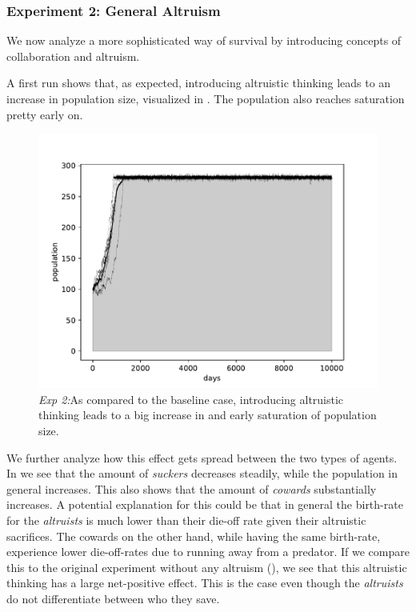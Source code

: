 \documentclass[sigconf]{acmart}
\newcommand{\todo}[1]{{\color{red}{#1}}}
\newcommand{\cowards}{\textit{cowards}\xspace}
\newcommand{\altruists}{\textit{altruists}\xspace}
\newcommand{\suckers}{\textit{suckers}\xspace}
\begin{document}
    \subsubsection*{Experiment 2: General Altruism}

    We now analyze a more sophisticated way of survival by introducing concepts of collaboration and altruism.

    A first run shows that, as expected, introducing altruistic thinking leads to an increase in population size, visualized in .
    The population also reaches saturation pretty early on.

    \begin{figure}
        \includegraphics[width=\columnwidth]{figures/alt_cow_increase_total}
        \caption{\textit{Exp 2:}As compared to the baseline case, introducing altruistic thinking leads to a big increase in and early saturation of population size.
        }
        \label{fig:alt_cow_total}
    \end{figure}

    We further analyze how this effect gets spread between the two types of agents.
    In  we see that the amount of \suckers decreases steadily, while the population in general increases.
    This also shows that the amount of \cowards substantially increases.
    A potential explanation for this could be that in general the birth-rate for the \altruists is much lower than their die-off rate given their altruistic sacrifices.
    The cowards on the other hand, while having the same birth-rate, experience lower die-off-rates due to running away from a predator.
    If we compare this to the original experiment without any altruism (), we see that this altruistic thinking has a large net-positive effect.
    This is the case even though the \altruists do not differentiate between who they save.
\end{document}
